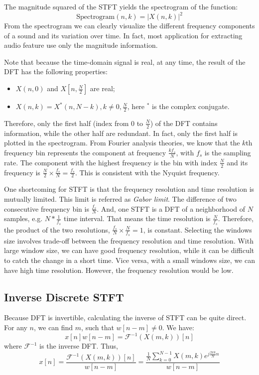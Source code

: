 \documentclass[11pt,a4paper]{report}
\begin{document}
The magnitude squared of the STFT yields the spectrogram of the function:
\[ \text{Spectrogram}(n, k) = \left|X(n,k)\right|^2 \]
From the spectrogram we can clearly visualize the different frequency components of a sound and its variation over time. In fact, most application for extracting audio feature use only the magnitude information.

Note that because the time-domain signal is real, at any time, the result of the DFT has the following properties:
\begin{itemize}
  \item $X(n,0)$ and $X[n, \frac{N}{2}]$ are real;
  \item $X(n,k) = X^*(n,N-k), k \neq 0, \frac{N}{2}$, here $^*$ is the complex conjugate.
\end{itemize}
Therefore, only the first half (index from $0$ to $\frac{N}{2}$) of the DFT contains information, while the other half are redundant. In fact, only the first half is plotted in the spectrogram. From Fourier analysis theories, we know that the $k$th frequency bin represents the component at frequency $\frac{kf_s}{N}$, with $f_s$ is the sampling rate. The component with the highest frequency is the bin with index $\frac{N}{2}$ and its frequency is $\frac{N}{2} \times \frac{f_s}{N} = \frac{f_s}{2}$. This is consistent with the Nyquist frequency.

One shortcoming for STFT is that the frequency resolution and time resolution is mutually limited. This limit is referred as \textit{Gabor limit}. The difference of two consecutive frequency bin is $\frac{f_s}{N}$. And, one STFT is a DFT of a neighborhood of $N$ samples, e.g. $N * \frac{1}{f_s}$ time interval. That means the time resolution is $\frac{N}{f_s}$. Therefore, the product of the two resolutions, $\frac{f_s}{N} \times \frac{N}{f_s} = 1$, is constant. Selecting the windows size involves trade-off between the frequency resolution and time resolution. With large window size, we can have good frequency resolution, while it can be difficult to catch the change in a short time. Vice versa, with a small windows size, we can have high time resolution. However, the frequency resolution would be low.

\subsection{Inverse Discrete STFT}
Because DFT is invertible, calculating the inverse of STFT can be quite direct. For any $n$, we can find $m$, such that $w[n-m] \neq 0$. We have:
\[ x[n]w[n-m] = \mathcal{F}^{-1}(X(m,k))[n] \]
where $\mathcal{F}^{-1}$ is the inverse DFT. Thus,
\begin{equation}
  x[n] =  \frac{\mathcal{F}^{-1}(X(m,k))[n]}{w[n-m]} = \frac{\frac{1}{N}\sum_{k=0}^{N-1} X(m,k)e^{j \frac{2\pi k}{N} n}}{w[n-m]}
  \label{eq:naiveinv}
\end{equation}
\end{document}
